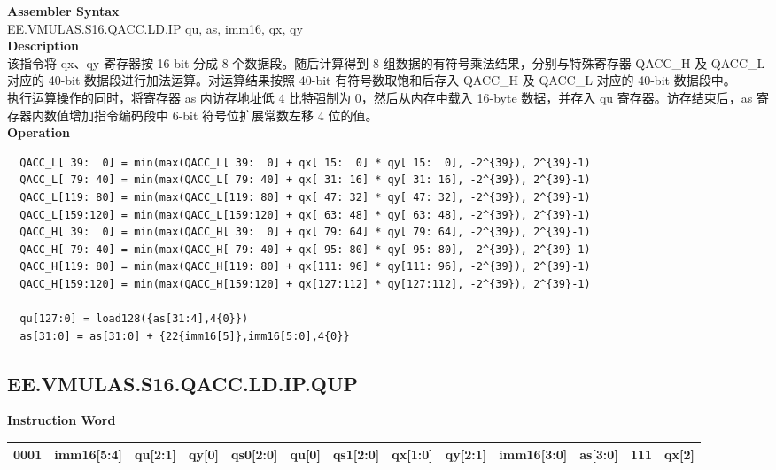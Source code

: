 \textbf{Assembler Syntax} \\
EE.VMULAS.S16.QACC.LD.IP qu, as, imm16, qx, qy \\
\textbf{Description} \\
该指令将 qx、qy 寄存器按 16-bit 分成 8 个数据段。随后计算得到 8 组数据的有符号乘法结果，分别与特殊寄存器 QACC\_H 及 QACC\_L 对应的 40-bit 数据段进行加法运算。对运算结果按照 40-bit 有符号数取饱和后存入 QACC\_H 及 QACC\_L 对应的 40-bit 数据段中。\\
执行运算操作的同时，将寄存器 as 内访存地址低 4 比特强制为 0，然后从内存中载入 16-byte 数据，并存入 qu 寄存器。访存结束后，as 寄存器内数值增加指令编码段中 6-bit 符号位扩展常数左移 4 位的值。\\
\textbf{Operation}
\begin{lstlisting}
  QACC_L[ 39:  0] = min(max(QACC_L[ 39:  0] + qx[ 15:  0] * qy[ 15:  0], -2^{39}), 2^{39}-1)
  QACC_L[ 79: 40] = min(max(QACC_L[ 79: 40] + qx[ 31: 16] * qy[ 31: 16], -2^{39}), 2^{39}-1)
  QACC_L[119: 80] = min(max(QACC_L[119: 80] + qx[ 47: 32] * qy[ 47: 32], -2^{39}), 2^{39}-1)
  QACC_L[159:120] = min(max(QACC_L[159:120] + qx[ 63: 48] * qy[ 63: 48], -2^{39}), 2^{39}-1)
  QACC_H[ 39:  0] = min(max(QACC_H[ 39:  0] + qx[ 79: 64] * qy[ 79: 64], -2^{39}), 2^{39}-1)
  QACC_H[ 79: 40] = min(max(QACC_H[ 79: 40] + qx[ 95: 80] * qy[ 95: 80], -2^{39}), 2^{39}-1)
  QACC_H[119: 80] = min(max(QACC_H[119: 80] + qx[111: 96] * qy[111: 96], -2^{39}), 2^{39}-1)
  QACC_H[159:120] = min(max(QACC_H[159:120] + qx[127:112] * qy[127:112], -2^{39}), 2^{39}-1)

  qu[127:0] = load128({as[31:4],4{0}})
  as[31:0] = as[31:0] + {22{imm16[5]},imm16[5:0],4{0}}
\end{lstlisting}

\clearpage
\subsection{EE.VMULAS.S16.QACC.LD.IP.QUP}\label{instruction:EEVMULASS16QACCLDIPQUP}
\setlength\tabcolsep{5pt}
\textbf{Instruction Word} \\
\begin{tabular}{|c|c|c|c|c|c|c|c|c|c|c|c|c|}
	\hline
	0001 & imm16[5:4] & qu[2:1] & qy[0] & qs0[2:0] & qu[0] & qs1[2:0] & qx[1:0] & qy[2:1] & imm16[3:0] & as[3:0] & 111 & qx[2] \\
	\hline
\end{tabular}

